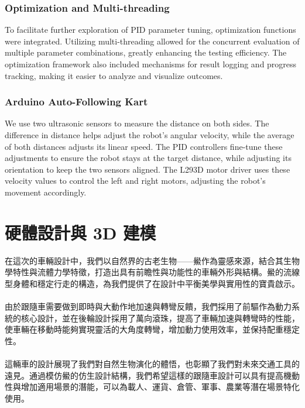\documentclass[a4paper,12pt]{article}
\begin{document}
\subsubsection{Optimization and Multi-threading}
To facilitate further exploration of PID parameter tuning, optimization functions were integrated. Utilizing multi-threading allowed for the concurrent evaluation of multiple parameter combinations, greatly enhancing the testing efficiency. The optimization framework also included mechanisms for result logging and progress tracking, making it easier to analyze and visualize outcomes.
\subsubsection{Arduino Auto-Following Kart}
We use two ultrasonic sensors to measure the distance on both sides. The difference in distance helps adjust the robot's angular velocity, while the average of both distances adjusts its linear speed. The PID controllers fine-tune these adjustments to ensure the robot stays at the target distance, while adjusting its orientation to keep the two sensors aligned. The L293D motor driver uses these velocity values to control the left and right motors, adjusting the robot's movement accordingly.

\section{硬體設計與 3D 建模}
在這次的車輛設計中，我們以自然界的古老生物——鱟作為靈感來源，結合其生物學特性與流體力學特徵，打造出具有前瞻性與功能性的車輛外形與結構。鱟的流線型身體和穩定行走的構造，為我們提供了在設計中平衡美學與實用性的寶貴啟示。\\\\
由於跟隨車需要做到即時與大動作地加速與轉彎反饋，我們採用了前驅作為動力系統的核心設計，並在後輪設計採用了萬向滾珠，提高了車輛加速與轉彎時的性能，使車輛在移動時能夠實現靈活的大角度轉彎，增加動力使用效率，並保持配重穩定性。\\\\
這輛車的設計展現了我們對自然生物演化的體悟，也彰顯了我們對未來交通工具的遠見。通過模仿鱟的仿生設計結構，我們希望這樣的跟隨車設計可以具有提高機動性與增加適用場景的潛能，可以為載人、運貨、倉管、軍事、農業等潛在場景特化使用。
\end{document}
